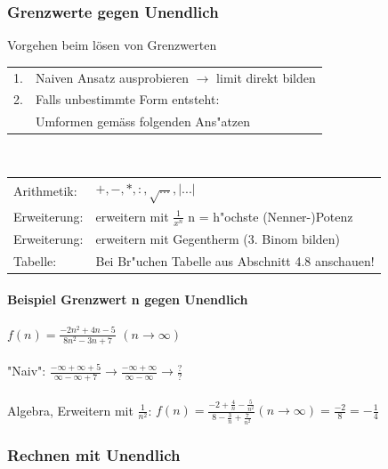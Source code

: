 			
			\subsubsection{Grenzwerte gegen Unendlich}
			Vorgehen beim lösen von Grenzwerten \\
			\begin{tabular}{ll}
			1. & Naiven Ansatz ausprobieren $\rightarrow$ limit direkt bilden \\
			2. & Falls unbestimmte Form entsteht: \\
			& Umformen gemäss folgenden Ans"atzen \\
			\end{tabular}
			\\
			
			\begin{tabular}{ll}
			Arithmetik: & $+, -, *, :, \sqrt{...}, \vert ...\vert$ \\
			Erweiterung:& erweitern mit $\frac{1}{x^n}$ n = h"ochste (Nenner-)Potenz \\
			Erweiterung: & erweitern mit Gegentherm (3. Binom bilden)\\
			Tabelle: & Bei Br"uchen Tabelle aus Abschnitt 4.8 anschauen! \\
			\end{tabular}

				\paragraph{Beispiel Grenzwert n gegen Unendlich}
				$f(n) = \frac{-2n^2+4n-5}{8n^2-3n+7}$ $(n \rightarrow \infty)$ \\
				\\
				"Naiv": $\frac{-\infty + \infty + 5}{\infty - \infty + 7} \rightarrow \frac{-\infty + \infty}{\infty - \infty} \rightarrow \frac{?}{?}$ \\
				\\
				Algebra, Erweitern mit $\frac{1}{n^2}$: $f(n) = \frac{-2+\frac{4}{n}-\frac{5}{n^2}}{8-\frac{3}{n}+\frac{7}{n^2}} (n \rightarrow \infty) = \frac{-2}{8} = -\frac{1}{4}$ \\
				
		
			\subsubsection{Rechnen mit Unendlich}
